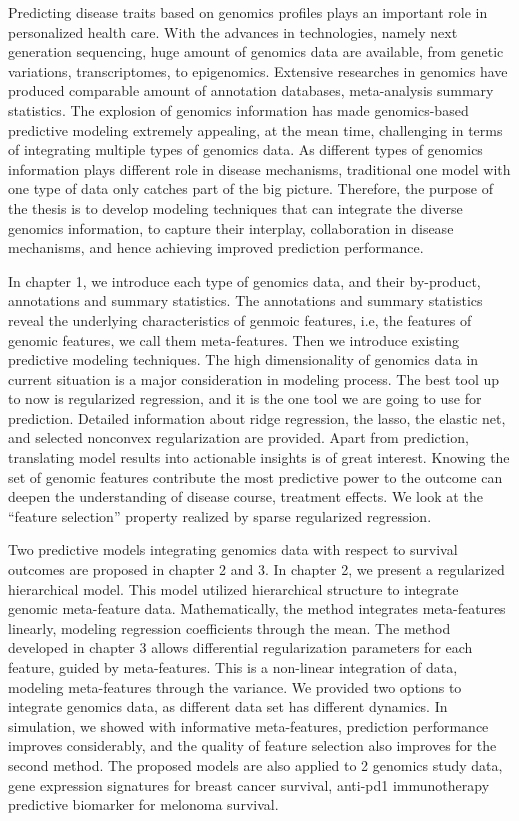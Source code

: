 Predicting disease traits based on genomics profiles plays an important role in personalized health care. With the advances in technologies, namely next generation sequencing, huge amount of genomics data are available, from genetic variations, transcriptomes, to epigenomics. Extensive researches in genomics have produced comparable amount of annotation databases, meta-analysis summary statistics. The explosion of genomics information has made genomics-based predictive modeling extremely appealing, at the mean time, challenging in terms of integrating multiple types of genomics data.  As different types of genomics information plays different role in disease mechanisms, traditional one model with one type of data only catches part of the big picture. Therefore, the purpose of the thesis is to develop modeling techniques that can integrate the diverse genomics information, to capture their interplay, collaboration in disease mechanisms, and hence achieving improved prediction performance. 

In chapter 1, we introduce each type of genomics data, and their by-product, annotations and summary statistics. The annotations and summary statistics reveal the underlying characteristics of genmoic features, i.e, the features of genomic features, we call them meta-features. Then we introduce existing predictive modeling techniques. The high dimensionality of genomics data in current situation is a major consideration in modeling process. The best tool up to now is regularized regression, and it is the one tool we are going to use for prediction. Detailed information about ridge regression, the lasso, the elastic net, and selected nonconvex regularization are provided. Apart from prediction, translating model results into actionable insights is of great interest. Knowing the set of genomic features contribute the most predictive power to the outcome can deepen the understanding of disease course, treatment effects. We look at the ``feature selection'' property realized by sparse regularized regression.

Two predictive models integrating genomics data with respect to survival outcomes are proposed in chapter 2 and 3. In chapter 2, we present a regularized hierarchical model. This model utilized hierarchical structure to integrate genomic meta-feature data. Mathematically, the method integrates meta-features linearly, modeling regression coefficients through the mean. The method developed in chapter 3 allows differential regularization parameters for each feature, guided by meta-features. This is a non-linear integration of data, modeling meta-features through the variance. We provided two options to integrate genomics data, as different data set has different dynamics. In simulation, we showed with informative meta-features, prediction performance improves considerably, and the quality of feature selection also improves for the second method. The proposed models are also applied to 2 genomics study data, gene expression signatures for breast cancer survival, anti-pd1 immunotherapy predictive biomarker for melonoma survival. 

